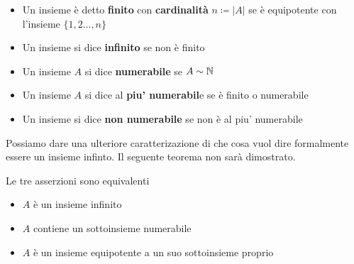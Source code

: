\begin{definition}{}

\begin{itemize}
    \item Un insieme è detto \textbf{finito} con \textbf{cardinalità} $n \coloneqq |A|$ se è equipotente con l'insieme $\{1,2\dots,n \}$

    \item Un insieme si dice \textbf{infinito} se non è finito

    \item Un insieme $A$ si dice \textbf{numerabile} se $A \sim \mathbb{N}$
    \item Un insieme $A$ si dice al \textbf{piu' numerabil}e se è finito o numerabile
    \item Un insieme si dice \textbf{non numerabile} se non è al piu' numerabile
    \end{itemize}
\end{definition}
Possiamo dare una ulteriore caratterizazione di che cosa vuol dire formalmente essere un insieme infinto. Il seguente teorema non sarà dimostrato.
\begin{theorem}{}
    Le tre asserzioni sono equivalenti
    \begin{itemize}
        \item $A$ è un insieme infinito
        \item $A$ contiene un sottoinsieme numerabile
        \item $A$ è un insieme equipotente a un suo sottoinsieme proprio
    \end{itemize}
\end{theorem}
